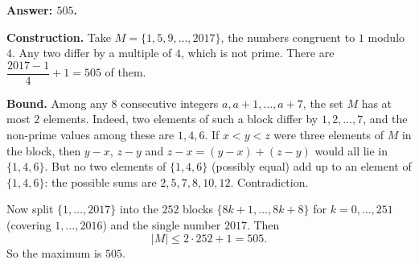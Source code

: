 \textbf{Answer: $505$.}

\textbf{Construction.} Take $M=\{1,5,9,\dots,2017\}$, the numbers congruent to $1$ modulo $4$. Any two differ by a multiple of $4$, which is not prime. There are $\dfrac{2017-1}{4}+1=505$ of them.

\textbf{Bound.} Among any $8$ consecutive integers $a,a+1,\dots,a+7$, the set $M$ has at most $2$ elements. Indeed, two elements of such a block differ by $1,2,\dots,7$, and the non-prime values among these are $1,4,6$. If $x<y<z$ were three elements of $M$ in the block, then $y-x$, $z-y$ and $z-x=(y-x)+(z-y)$ would all lie in $\{1,4,6\}$. But no two elements of $\{1,4,6\}$ (possibly equal) add up to an element of $\{1,4,6\}$: the possible sums are $2,5,7,8,10,12$. Contradiction.

Now split $\{1,\dots,2017\}$ into the $252$ blocks $\{8k+1,\dots,8k+8\}$ for $k=0,\dots,251$ (covering $1,\dots,2016$) and the single number $2017$. Then
\[
|M|\le2\cdot252+1=505 .
\]
So the maximum is $\boxed{505}$.
